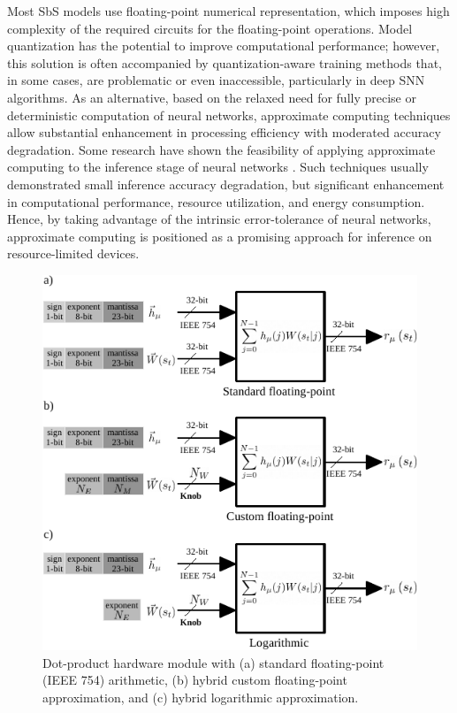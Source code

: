 Most SbS models use floating-point numerical representation, which imposes high complexity of the required circuits for the floating-point operations. Model quantization has the potential to improve computational performance; however, this solution is often accompanied by quantization-aware training methods that, in some cases, are problematic or even inaccessible, particularly in deep SNN algorithms\cite{zhang2018survey}. 
As an alternative, based on the relaxed need for fully precise or deterministic computation of neural networks, approximate computing techniques allow substantial enhancement in processing efficiency with moderated accuracy degradation. Some research  have shown the feasibility of applying approximate computing to the inference stage of neural networks \cite{lotrivc2012applicability, sarwar2016multiplier, mrazek2016design, du2014leveraging}. Such techniques usually demonstrated small inference accuracy degradation, but significant enhancement in computational performance, resource utilization, and energy consumption. Hence, by taking advantage of the intrinsic error-tolerance of neural networks, approximate computing is positioned as a promising approach for inference on resource-limited devices.

\begin{figure}
	\includegraphics[width=\columnwidth]{../figures/dot-product_unit.pdf}
	\caption{Dot-product hardware module with (a) standard floating-point (IEEE 754) arithmetic, (b) hybrid custom floating-point approximation, and (c) hybrid logarithmic approximation.}
	\label{fig:dot_product_unit}
\end{figure}

